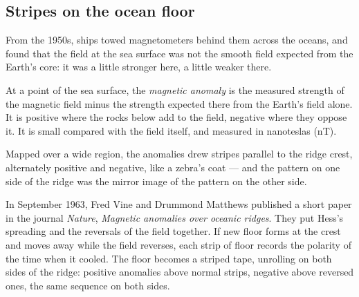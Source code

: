 \subsection{Stripes on the ocean floor}

From the 1950s, ships towed magnetometers behind them across the oceans, and
found that the field at the sea surface was not the smooth field expected from
the Earth's core: it was a little stronger here, a little weaker there.

\begin{definition}\label{def:g11:drift-to-spreading:anomaly}
At a point of the sea surface, the
\emph{magnetic anomaly} is the measured strength of the magnetic field minus the strength
expected there from the Earth's field alone. It is positive where the rocks
below add to the field, negative where they oppose it. It is small compared
with the field itself, and measured in nanoteslas (\unit{nT}).
\end{definition}

Mapped over a wide region, the anomalies drew stripes parallel to the ridge
crest, alternately positive and negative, like a zebra's coat --- and the pattern
on one side of the ridge was the mirror image of the pattern on the other side.

\begin{history}
In September 1963, Fred Vine and Drummond Matthews published a short paper in the journal \emph{Nature},
\emph{Magnetic anomalies over oceanic ridges}. They put Hess's spreading and
the reversals of the field together. If new floor forms at the crest and moves
away while the field reverses, each strip of floor records the polarity of the
time when it cooled. The floor becomes a striped tape, unrolling on both sides
of the ridge: positive anomalies above normal strips, negative above reversed
ones, the same sequence on both sides.
\end{history}

